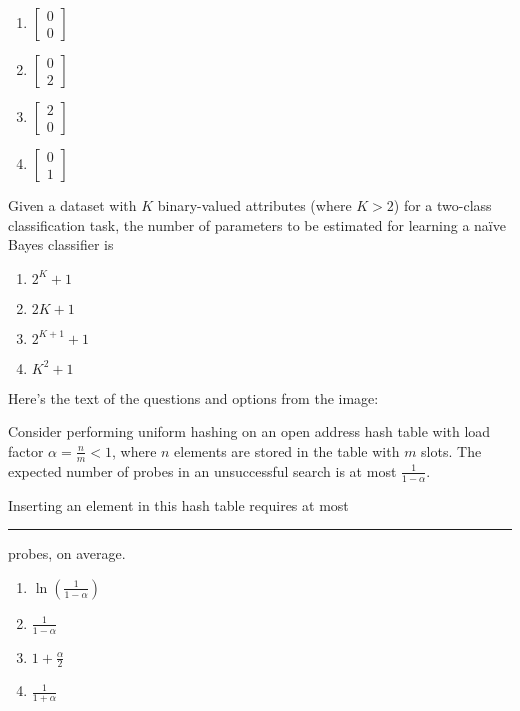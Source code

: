 \begin{enumerate}
    \item $ \begin{bmatrix} 0 \\ 0 \end{bmatrix} $ \\
    \item $ \begin{bmatrix} 0 \\ 2 \end{bmatrix} $ \\
    \item $ \begin{bmatrix} 2 \\ 0 \end{bmatrix} $ \\
    \item $ \begin{bmatrix} 0 \\ 1 \end{bmatrix} $
\end{enumerate}

\item Given a dataset with $ K $ binary-valued attributes (where $ K > 2 $) for a two-class classification task, the number of parameters to be estimated for learning a naïve Bayes classifier is

\begin{enumerate}
    \item $ 2^K + 1 $
    \item $ 2K + 1 $
    \item $ 2^{K+1} + 1 $
    \item $ K^2 + 1 $
\end{enumerate}

Here's the text of the questions and options from the image:


\item Consider performing uniform hashing on an open address hash table with load factor $\alpha = \frac{n}{m} < 1$, where $n$ elements are stored in the table with $m$ slots. The expected number of probes in an unsuccessful search is at most $\frac{1}{1 - \alpha}$.

Inserting an element in this hash table requires at most \rule{1.5cm}{0.4pt} probes, on average.

\begin{enumerate}
    \item $\ln\left(\frac{1}{1 - \alpha}\right)$
    \item $\frac{1}{1 - \alpha}$
    \item $1 + \frac{\alpha}{2}$
    \item $\frac{1}{1 + \alpha}$
\end{enumerate}

